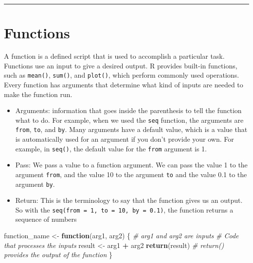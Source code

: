 \documentclass[
]{book}
\newenvironment{Shaded}{\begin{snugshade}}{\end{snugshade}}
\newcommand{\CommentTok}[1]{\textcolor[rgb]{0.56,0.35,0.01}{\textit{#1}}}
\newcommand{\ControlFlowTok}[1]{\textcolor[rgb]{0.13,0.29,0.53}{\textbf{#1}}}
\newcommand{\FunctionTok}[1]{\textcolor[rgb]{0.13,0.29,0.53}{\textbf{#1}}}
\newcommand{\NormalTok}[1]{#1}
\newcommand{\OtherTok}[1]{\textcolor[rgb]{0.56,0.35,0.01}{#1}}
\newcommand{\SpecialCharTok}[1]{\textcolor[rgb]{0.81,0.36,0.00}{\textbf{#1}}}
\providecommand{\tightlist}{%
  \setlength{\itemsep}{0pt}\setlength{\parskip}{0pt}}
\begin{document}
\begin{center}\rule{0.5\linewidth}{0.5pt}\end{center}

\section{Functions}\label{functions}

A function is a defined script that is used to accomplish a particular task. Functions use an input to give a desired output. R provides built-in functions, such as \texttt{mean()}, \texttt{sum()}, and \texttt{plot()}, which perform commonly used operations. Every function has arguments that determine what kind of inputs are needed to make the function run.

\begin{itemize}
\tightlist
\item
  Arguments: information that goes inside the parenthesis to tell the function what to do. For example, when we used the \texttt{seq} function, the arguments are \texttt{from}, \texttt{to}, and \texttt{by}. Many arguments have a default value, which is a value that is automatically used for an argument if you don't provide your own. For example, in \texttt{seq()}, the default value for the \texttt{from} argument is 1.
\item
  Pass: We pass a value to a function argument. We can pass the value 1 to the argument \texttt{from}, and the value 10 to the argument \texttt{to} and the value 0.1 to the argument \texttt{by}.
\item
  Return: This is the terminology to say that the function gives us an output. So with the \texttt{seq(from\ =\ 1,\ to\ =\ 10,\ by\ =\ 0.1)}, the function returns a sequence of numbers
\end{itemize}

\begin{Shaded}
\begin{Highlighting}[]
\NormalTok{function\_name }\OtherTok{\textless{}{-}} \ControlFlowTok{function}\NormalTok{(arg1, arg2) \{ }\CommentTok{\# arg1 and arg2 are inputs}
  \CommentTok{\# Code that processes the inputs}
\NormalTok{  result }\OtherTok{\textless{}{-}}\NormalTok{ arg1 }\SpecialCharTok{+}\NormalTok{ arg2}
  \FunctionTok{return}\NormalTok{(result)  }\CommentTok{\# return() provides the output of the function}
\NormalTok{\}}
\end{Highlighting}
\end{Shaded}
\end{document}
